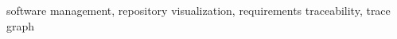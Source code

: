 \documentclass[conference]{IEEEtran}
\begin{document}
\begin{abstract}

\end{abstract}
\begin{IEEEkeywords}
  software management, repository visualization, requirements traceability, trace graph
\end{IEEEkeywords}



















\end{document}

